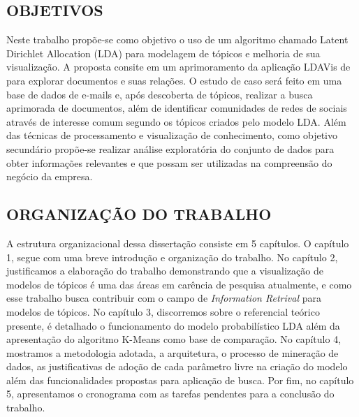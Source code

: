 \documentclass[12pt,a4paper]{article}
\begin{document}
\subsection{OBJETIVOS} \label{sec:objetivo}

Neste trabalho propõe-se como objetivo o uso de um algoritmo chamado Latent Dirichlet Allocation (LDA) \cite{blei2003latent} para modelagem de tópicos e melhoria de sua visualização. A proposta consite em um aprimoramento da aplicação LDAVis de  para explorar documentos e suas relações. O estudo de caso será feito em uma base de dados de e-mails e, após descoberta de tópicos, realizar a busca aprimorada de documentos, além de identificar  comunidades de redes de sociais através de interesse comum segundo os tópicos criados pelo modelo LDA. Além das técnicas de processamento e visualização de conhecimento, como objetivo secundário propõe-se realizar análise exploratória do conjunto de dados para obter informações relevantes e que possam ser utilizadas na compreensão do negócio da empresa.


\subsection{ORGANIZAÇÃO DO TRABALHO} \label{sec:organizacao}

 A estrutura organizacional dessa dissertação consiste em 5 capítulos. O capítulo 1, segue com uma breve introdução e organização do trabalho. 
  No capítulo 2, justificamos a elaboração do trabalho demonstrando que a visualização de modelos de tópicos é uma das áreas em carência de pesquisa atualmente, 
  e como esse trabalho busca contribuir com o campo de \textit{Information Retrival} para modelos de tópicos. No capítulo 3, discorremos sobre o referencial teórico presente, 
  é detalhado o funcionamento do modelo probabilístico LDA além da apresentação do algoritmo K-Means como base de comparação. No capítulo 4, mostramos a metodologia adotada, 
  a arquitetura, o processo de mineração de dados, as justificativas de adoção de cada parâmetro livre na criação do modelo além das funcionalidades propostas para
  aplicação de busca. Por fim, no capítulo 5, apresentamos o cronograma com as tarefas pendentes para a conclusão do trabalho.




\end{document}
